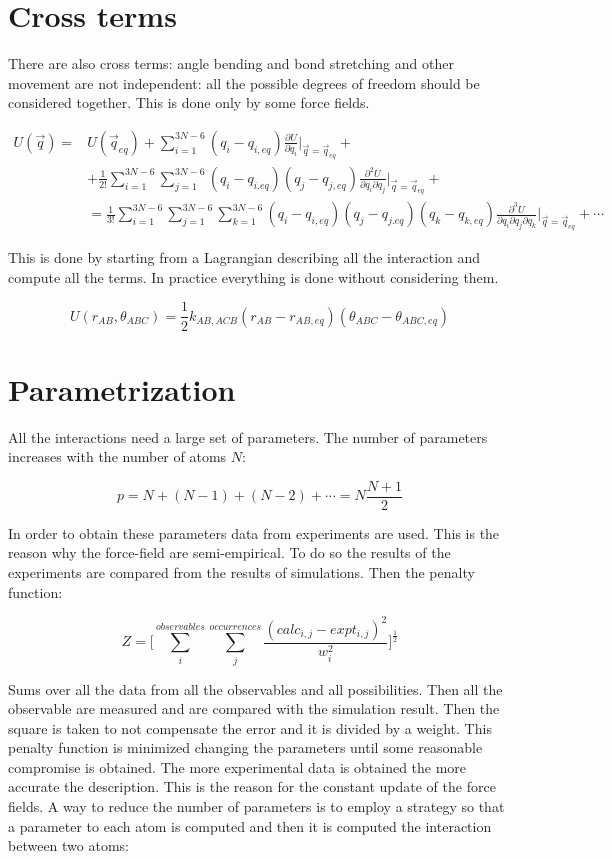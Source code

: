 \section{Cross terms}
There are also cross terms: angle bending and bond stretching and other movement are not independent: all the possible degrees of freedom should be considered together.
This is done only by some force fields.

\begin{align*}
	U(\vec{q}) = &U(\vec{q}_{eq}) + \sum\limits_{i=1}^{3N-6}(q_i-q_{i,eq})\frac{\partial U}{\partial q_i}|_{\vec{q}=\vec{q}_{eq}} + \\
							 &+\frac{1}{2!}\sum\limits_{i=1}^{3N-6}\sum\limits_{j=1}^{3N-6}(q_i-q_{i.eq})(q_j-q_{j,eq})\frac{\partial^2 U}{\partial q_i\partial q_j}|_{\vec{q}=\vec{q}_{eq}} +\\
							 &=\frac{1}{3!}\sum\limits_{i=1}^{3N-6}\sum\limits_{j=1}^{3N-6}\sum\limits_{k=1}^{3N-6}(q_i-q_{i,eq})(q_j-q_{j.eq})(q_k-q_{k,eq})\frac{\partial^3 U}{\partial q_i\partial q_j\partial q_k}|_{\vec{q}=\vec{q}_{eq}} + \cdots
\end{align*}

This is done by starting from a Lagrangian describing all the interaction and compute all the terms.
In practice everything is done without considering them.

$$U(r_{AB}, \theta_{ABC}) = \frac{1}{2}k_{AB,ACB}(r_{AB}-r_{AB, eq})(\theta_{ABC}-\theta_{ABC, eq})$$

\section{Parametrization}
All the interactions need a large set of parameters.
The number of parameters increases with the number of atoms $N$:

$$p = N + (N-1)+(N-2)+\cdots = N\frac{N+1}{2}$$

In order to obtain these parameters data from experiments are used.
This is the reason why the force-field are semi-empirical.
To do so the results of the experiments are compared from the results of simulations.
Then the penalty function:

$$Z = \biggl[\sum\limits_{i}^{observables}\sum\limits_{j}^{occurrences}\frac{(calc_{i,j}-expt_{i,j})^2}{w_i^2}\biggr]^{\frac{1}{2}}$$

Sums over all the data from all the observables and all possibilities.
Then all the observable are measured and are compared with the simulation result.
Then the square is taken to not compensate the error and it is divided by a weight.
This penalty function is minimized changing the parameters until some reasonable compromise is obtained.
The more experimental data is obtained the more accurate the description.
This is the reason for the constant update of the force fields.
A way to reduce the number of parameters is to employ a strategy so that a parameter to each atom is computed and then it is computed the interaction between two atoms:


